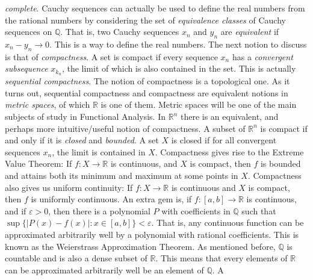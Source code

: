 \documentclass[crop=false,class=article,oneside]{standalone}
\begin{document}
            \textit{complete}. Cauchy sequences can actually be
            used to define the real numbers from the rational
            numbers by considering the set of
            \textit{equivalence classes} of Cauchy sequences on
            $\mathbb{Q}$. That is, two Cauchy sequences
            $x_{n}$ and $y_{n}$ are \textit{equivalent} if
            $x_{n}-y_{n}\rightarrow{0}$. This is a way to define
            the real numbers. The next notion to discuss is that
            of \textit{compactness}. A set is compact if every
            sequence $x_{n}$ has a \textit{convergent subsequence}
            $x_{k_{n}}$, the limit of which is also contained in
            the set. This is actually
            \textit{sequential compactness}. The notion of
            compactness is a topological one. As it turns out,
            sequential compactness and compactness are
            equivalent notions in \textit{metric spaces}, of
            which $\mathbb{R}$ is one of them. Metric spaces
            will be one of the main subjects of study in
            Functional Analysis. In $\mathbb{R}^{n}$ there is
            an equivalent, and perhaps more intuitive/useful
            notion of compactness. A subset of $\mathbb{R}^{n}$
            is compact if and only if it is
            \textit{closed} and \textit{bounded}. A set $X$ is
            closed if for all convergent sequences $x_{n}$,
            the limit is contained in $X$. Compactness gives rise
            to the Extreme Value Theorem: If $f:X\rightarrow\mathbb{R}$
            is continuous, and $X$ is compact, then $f$ is bounded
            and attains both its minimum and maximum at some points
            in $X$. Compactness also gives us uniform continuity:
            If $f:X\rightarrow\mathbb{R}$ is continuous and $X$
            is compact, then $f$ is uniformly continuous.
            An extra gem is, if $f:[a,b]\rightarrow\mathbb{R}$
            is continuous, and if $\varepsilon>0$, then there is
            a polynomial $P$ with coefficients in $\mathbb{Q}$
            such that $\sup\{|P(x)-f(x)|:x\in[a,b]\}<\varepsilon$.
            That is, any continuous function can be approximated
            arbitrarily well by a polynomial with rational
            coefficients. This is known as the
            Weierstrass Approximation Theorem. As mentioned
            before, $\mathbb{Q}$ is countable and is also
            a dense subset of $\mathbb{R}$. This means that
            every elements of $\mathbb{R}$ can be approximated
            arbitrarily well be an element of $\mathbb{Q}$. A
\end{document}
